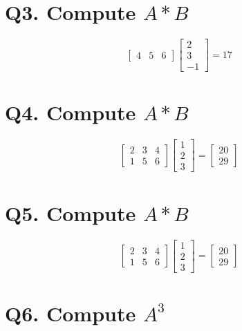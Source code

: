 \documentclass[
  letterpaper,
  DIV=11,
  numbers=noendperiod]{scrartcl}
\begin{document}
\hypertarget{q3.-compute-a-b}{%
\section{\texorpdfstring{Q3. Compute
\(A * B\)}{Q3. Compute A * B}}\label{q3.-compute-a-b}}

\[
\begin{bmatrix}
4 & 5 & 6 \end{bmatrix}
\begin{bmatrix}
2\\3\\-1 \end{bmatrix} = 17
\]

\hypertarget{q4.-compute-a-b}{%
\section{\texorpdfstring{Q4. Compute
\(A * B\)}{Q4. Compute A * B}}\label{q4.-compute-a-b}}

\[
\begin{bmatrix}
2 & 3 & 4\\
1 & 5 & 6 \end{bmatrix} 
\begin{bmatrix}
1\\2\\3 \end{bmatrix} = \begin{bmatrix}
20\\29 \end{bmatrix}
\]

\hypertarget{q5.-compute-a-b}{%
\section{\texorpdfstring{Q5. Compute
\(A * B\)}{Q5. Compute A * B}}\label{q5.-compute-a-b}}

\[
\begin{bmatrix}
2 & 3 & 4\\
1 & 5 & 6\end{bmatrix}
\begin{bmatrix}
1\\2\\3\end{bmatrix} =
\begin{bmatrix}
20\\29 \end{bmatrix}
\]

\hypertarget{q6.-compute-a3}{%
\section{\texorpdfstring{Q6. Compute
\(A^3\)}{Q6. Compute A\^{}3}}\label{q6.-compute-a3}}
\end{document}
